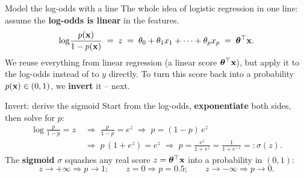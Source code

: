 \documentclass[aspectratio=169]{beamer}
\begin{document}
\begin{frame}{Model the log-odds with a line}
  The whole idea of logistic regression in one line: assume the \textbf{log-odds is
  linear} in the features.
  \[
    \log\!\frac{p(\mathbf{x})}{1-p(\mathbf{x})} \;=\; z \;=\; \theta_0 + \theta_1 x_1 + \dots + \theta_p x_p \;=\; \bm{\theta}^\top \mathbf{x} .
  \]
  \vfill
  We reuse everything from linear regression (a linear score $\bm{\theta}^\top \mathbf{x}$), but apply it to
  the log-odds instead of to $y$ directly.
  \vfill
  To turn this score back into a probability $p(\mathbf{x}) \in (0,1)$, we \textbf{invert} it -- next.
\end{frame}

\begin{frame}{Invert: derive the sigmoid}
  Start from the log-odds, \textbf{exponentiate} both sides, then solve for $p$:
  \begin{align*}
    \log\tfrac{p}{1-p} = z
      &\;\Rightarrow\; \tfrac{p}{1-p} = e^{z}
      \;\Rightarrow\; p = (1-p)\,e^{z} \\
      &\;\Rightarrow\; p\,(1+e^{z}) = e^{z}
      \;\Rightarrow\; p = \tfrac{e^z}{1+e^z} = \tfrac{1}{1+e^{-z}} =: \sigma(z).
  \end{align*}
  \vfill
  The \textbf{sigmoid} $\sigma$ squashes any real score $z = \bm{\theta}^\top \mathbf{x}$ into a probability in $(0,1)$:
  \[
    z \to +\infty \Rightarrow p \to 1; \qquad z = 0 \Rightarrow p = 0.5; \qquad z \to -\infty \Rightarrow p \to 0 .
  \]
  \vfill
\end{frame}
\end{document}
